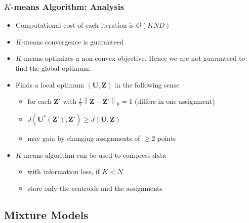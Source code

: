 \documentclass[11pt,a4paper,technote]{IEEEtran}
\DeclareMathOperator*{\argmin}{\arg\!\min}
\newcommand{\norm}[1]{\left\lVert#1\right\rVert}
\newcommand{\matr}[1]{\boldsymbol{\mathbf{#1}}}
\newcommand{\vect}[1]{\boldsymbol{\mathbf{#1}}}
\begin{document}
\subsubsection*{$K$-means Algorithm: Analysis}
\begin{itemize}
  \item Computational cost of each iteration is $O(KND)$
  \item $K$-means convergence is guaranteed
  \item $K$-means optimizes a non-convex objective. Hence we are not guaranteed
    to find the global optimum.
  \item Finds a local optimum $(\matr{U},\matr{Z})$ in the following sense
    \begin{itemize}
      \item for each $\matr{Z}'$ with $\frac{1}{2}\norm{\matr{Z}-\matr{Z}'}_0 = 1$
        (differs in one assignment)
      \item $J(\matr{U}^*(\matr{Z}'), \matr{Z}') \geq J(\matr{U},\matr{Z})$
      \item may gain by changing assignments of $\geq 2$ points
    \end{itemize}
  \item $K$-means algorithm can be used to compress data
    \begin{itemize}
      \item with information loss, if $K < N$
      \item store only the centroids and the assignments
    \end{itemize}
\end{itemize}

\subsection*{Mixture Models}
\end{document}
